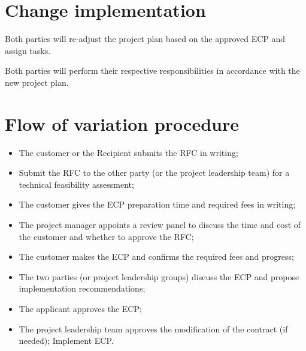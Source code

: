 \section{Change implementation}

Both parties will re-adjust the project plan based on the approved ECP and assign tasks.

Both parties will perform their respective responsibilities in accordance with the new project plan.

\section{Flow of variation procedure}

\begin{itemize}
\item The customer or the Recipient submits the RFC in writing;

\item Submit the RFC to the other party (or the project leadership team) for a technical feasibility assessment;

\item The customer gives the ECP  preparation time and required fees in writing;

\item The project manager appoints a review panel to discuss the time and cost of the customer  and whether to approve the RFC;

\item The customer makes the ECP and confirms the required fees and progress;

\item The two parties (or project leadership groups) discuss the ECP and propose implementation recommendations;

\item The applicant approves the ECP;

\item The project leadership team approves the modification of the contract (if needed);
Implement ECP.
\end{itemize}



